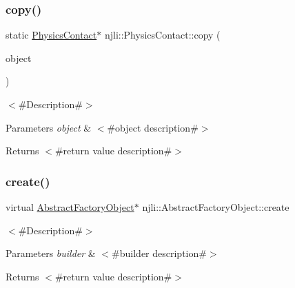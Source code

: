 \subsubsection{\texorpdfstring{copy()}{copy()}}
{\footnotesize\ttfamily static \mbox{\hyperlink{classnjli_1_1_physics_contact}{Physics\+Contact}}$\ast$ njli\+::\+Physics\+Contact\+::copy (\begin{DoxyParamCaption}\item[{const \mbox{\hyperlink{classnjli_1_1_physics_contact}{Physics\+Contact}} \&}]{object }\end{DoxyParamCaption})\hspace{0.3cm}{\ttfamily [static]}}

$<$\#\+Description\#$>$


\begin{DoxyParams}{Parameters}
{\em object} & $<$\#object description\#$>$\\
\hline
\end{DoxyParams}
\begin{DoxyReturn}{Returns}
$<$\#return value description\#$>$ 
\end{DoxyReturn}
\mbox{\label{classnjli_1_1_physics_contact_a83a8876ae63b92804004cf3febe76573}} 
\subsubsection{\texorpdfstring{create()}{create()}\hspace{0.1cm}{\footnotesize\ttfamily [1/3]}}
{\footnotesize\ttfamily virtual \mbox{\hyperlink{classnjli_1_1_abstract_factory_object}{Abstract\+Factory\+Object}}$\ast$ njli\+::\+Abstract\+Factory\+Object\+::create}

$<$\#\+Description\#$>$


\begin{DoxyParams}{Parameters}
{\em builder} & $<$\#builder description\#$>$\\
\hline
\end{DoxyParams}
\begin{DoxyReturn}{Returns}
$<$\#return value description\#$>$ 
\end{DoxyReturn}
\mbox{\label{classnjli_1_1_physics_contact_ab71fc4798c6035544efd00cf20ced421}} 
